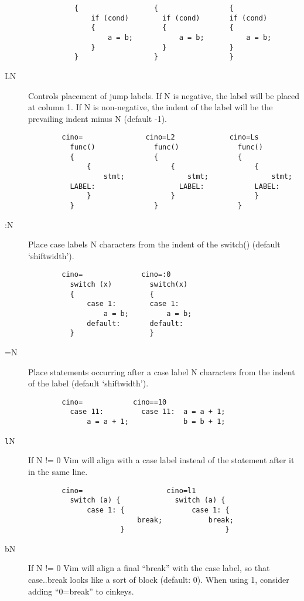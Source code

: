 \begin{description}
\begin{verbatim}
           {                  {                 {
               if (cond)        if (cond)       if (cond)
               {                {               {
                   a = b;           a = b;          a = b;
               }                }               }
           }                  }                 }
 \end{verbatim}
    \item[LN] Controls placement of jump labels. If N is negative, the label
          will be placed at column 1. If N is non-negative, the indent of
          the label will be the prevailing indent minus N  (default -1).          
\begin{verbatim}
        cino=               cino=L2             cino=Ls
          func()              func()              func()
          {                   {                   {
              {                   {                   {
                  stmt;               stmt;               stmt;
          LABEL:                    LABEL:            LABEL:
              }                   }                   }
          }                   }                   }
 \end{verbatim}
 \clearpage
    \item[:N] Place case labels N characters from the indent of the switch()
          (default `shiftwidth').
\begin{verbatim}
        cino=              cino=:0
          switch (x)         switch(x)
          {                  {
              case 1:        case 1:
                  a = b;         a = b;
              default:       default:
          }                  }
 \end{verbatim}
 
    \item[=N] Place statements occurring after a case label N characters from
          the indent of the label  (default `shiftwidth').
\begin{verbatim}
        cino=            cino==10
          case 11:         case 11:  a = a + 1;
              a = a + 1;             b = b + 1;
 \end{verbatim}
 
    \item[\texttt{l}N] If N != 0 Vim will align with a case label instead of the
          statement after it in the same line.
\begin{verbatim}
        cino=                    cino=l1
          switch (a) {             switch (a) {
              case 1: {                case 1: {
                          break;           break;
                      }                        }
 \end{verbatim}
 \clearpage
    \item[bN] If N != 0 Vim will align a final ``break'' with the case label,
          so that case..break looks like a sort of block  (default: 0).
          When using 1, consider adding ``0=break'' to cinkeys.


\end{description}
